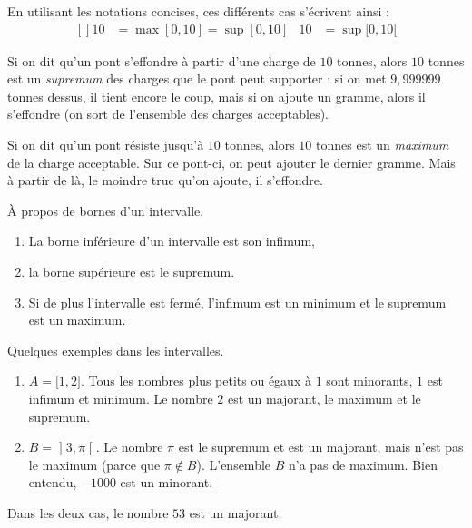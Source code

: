 En utilisant les notations concises, ces différents cas s'écrivent ainsi :
\begin{equation}
	\begin{aligned}[]
		10 & =\max[0,10]=\sup[0,10] & 10 & =\sup[0,10[
	\end{aligned}
\end{equation}


\begin{example}
	Si on dit qu'un pont s'effondre à partir d'une charge de \( 10\) tonnes, alors \( 10\) tonnes est un \emph{supremum} des charges que le pont peut supporter : si on met \( 9,999999\) tonnes dessus, il tient encore le coup, mais si on ajoute un gramme, alors il s'effondre (on sort de l'ensemble des charges acceptables).
\end{example}

\begin{example}
	Si on dit qu'un pont résiste jusqu'à \( 10\) tonnes, alors \( 10\) tonnes est un \emph{maximum} de la charge acceptable. Sur ce pont-ci, on peut ajouter le dernier gramme. Mais à partir de là, le moindre truc qu'on ajoute, il s'effondre.
\end{example}

\begin{lemma}       \label{LEMooWCUXooFqTwDK}
	À propos de bornes d'un intervalle.
	\begin{enumerate}
		\item
		      La borne inférieure d'un intervalle est son infimum,
		\item
		      la borne supérieure est le supremum.
		\item
		      Si de plus l'intervalle est fermé, l'infimum est un minimum et le supremum est un maximum.
	\end{enumerate}
\end{lemma}


\begin{example}
	Quelques exemples dans les intervalles.
	\begin{enumerate}
		\item
		      \( A=\mathopen[ 1 , 2 \mathclose]\). Tous les nombres plus petits ou égaux à \( 1\) sont minorants, \( 1\) est infimum et minimum. Le nombre \( 2\) est un majorant, le maximum et le supremum.
		\item
		      \( B=\mathopen] 3 , \pi \mathclose[\). Le nombre \( \pi\) est le supremum et est un majorant, mais n'est pas le maximum (parce que \( \pi\notin B\)). L'ensemble \( B\) n'a pas de maximum. Bien entendu, \( -1000\) est un minorant.
	\end{enumerate}
	Dans les deux cas, le nombre \( 53\) est un majorant.
\end{example}


